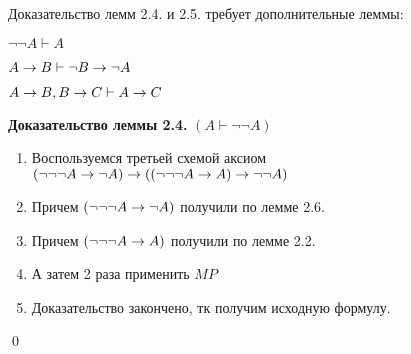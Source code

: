 Доказательство лемм 2.4. и 2.5. требует дополнительные леммы:
\begin{lemma}
$\neg \neg A\vdash A$
\end{lemma}
\begin{lemma}
$A\rightarrow B \vdash \neg B \rightarrow \neg A$ 
\end{lemma}
\begin{lemma}
$A\rightarrow B, B\rightarrow C \vdash A \rightarrow C$ \\
\end{lemma}
\textbf{Доказательство леммы 2.4.} $(A\vdash \neg \neg A)$\\

\begin{enumerate}
\item Воспользуемся третьей схемой аксиом
  \hspace{5mm} $(\neg \neg \neg A\rightarrow \neg A) \rightarrow ((\neg \neg \neg A\rightarrow  A) \rightarrow \neg \neg A)$
\item Причем $(\neg \neg \neg A\rightarrow \neg A)$ получили по лемме 2.6.
\item Причем $(\neg \neg \neg A\rightarrow  A)$ получили по лемме 2.2.
\item А затем 2 раза применить $MP$
\item Доказательство закончено, тк получим исходную формулу.
\end{enumerate}
\qed


